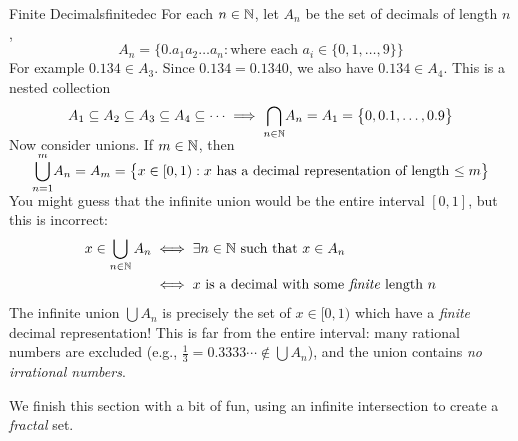 \begin{example}{Finite Decimals}{finitedec}
	For each $n\in\mathbb{N}$, let $A_n$ be the set of decimals of length $n$,
	\[
		A_n=\bigl\{0.a_1a_2\ldots a_n:\text{where each $a_i\in\{0,1,\ldots,9\}$}\bigr\}
	\]
	For example $0.134\in A_3$. Since $0.134=0.1340$, we also have $0.134\in A_4$. This is a nested collection
	\[
		A_1\subseteq A_2\subseteq A_3\subseteq A_4\subseteq\cdots \implies \smash[b]{\bigcap_{n\in\mathbb{N}}}A_n=A_1=\bigl\{0,0.1,\ldots,0.9\bigr\}
	\]
	Now consider unions. If $m\in\mathbb{N}$, then
	\[
		\smash{\bigcup_{n=1}^m}A_n=A_m=\bigl\{x\in [0,1):x\text{ has a decimal representation of length $\le m$}\bigr\}
	\]
	You might guess that the infinite union would be the entire\footnotemark{} interval $[0,1]$, but this is incorrect:
	\begin{align*}
		x\in\bigcup_{n\in\mathbb{N}}A_n &\iff\exists n\in\mathbb{N}\text{ such that }x\in A_n\\
		&\iff x\text{ is a decimal with some \emph{finite} length $n$}
	\end{align*}
	The infinite union $\bigcup A_n$ is precisely the set of $x\in[0,1)$ which have a \emph{finite} decimal representation! This is far from the entire interval: many rational numbers are excluded (e.g., $\frac 13=0.3333\cdots \notin\bigcup A_n$), and the union contains \emph{no irrational numbers}. %
\end{example}


\goodbreak



 We finish this section with a bit of fun, using an infinite intersection to create a \emph{fractal} set.

